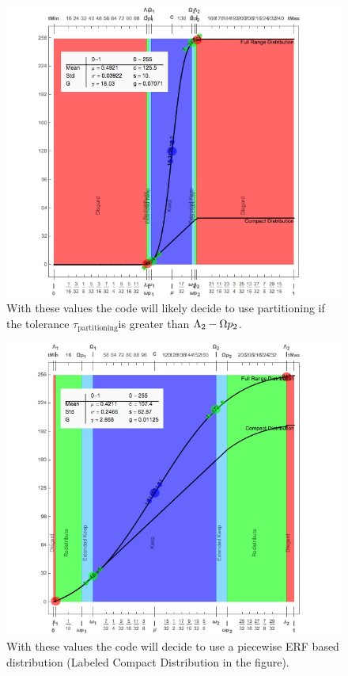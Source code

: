 \begin{figure}[h]
\centering
\includegraphics[width=1\linewidth]{Chapter2/Figs/usePartitioning}
\caption{With these values the code will likely decide to use partitioning if the tolerance $\tau_{\text{partitioning}}$is greater than $\Lambda_2-\Omega p_2$.}
\label{fig:usePartitioning}
\end{figure}

\begin{figure}[h]
\centering
\includegraphics[width=1\linewidth]{Chapter2/Figs/usePiecewiseERF}
\caption{With these values the code will decide to use a piecewise ERF based distribution (Labeled Compact Distribution in the figure).}
\label{fig:usePiecewiseERF}
\end{figure}


